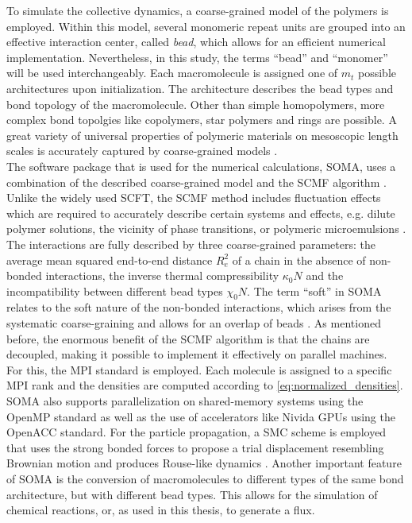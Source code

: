\documentclass[bachelor,       %
               twoside,        %
               BCOR10mm,       %
               ngerman, english %
               ]{GAUBM}
\begin{document}
To simulate the collective dynamics, a coarse-grained model of the polymers is employed. Within this model, several monomeric repeat units are grouped into an effective interaction center, called \textit{bead}, which allows for an efficient numerical implementation. Nevertheless, in this study, the terms \enquote{bead} and \enquote{monomer} will be used interchangeably. Each macromolecule is assigned one of $m_t$ possible architectures upon initialization. The architecture describes the bead types and bond topology of the macromolecule. Other than simple homopolymers, more complex bond topolgies like copolymers, star polymers and rings are possible. A great variety of universal properties of polymeric materials on mesoscopic length scales is accurately captured by coarse-grained models \cite{Baschnagel03}.\\
The software package that is used for the numerical calculations, \ac{SOMA}, uses a combination of the described coarse-grained model and the \ac{SCMF} algorithm \cite{Daoulas06}. Unlike the widely used \ac{SCFT}, the \ac{SCMF} method includes fluctuation effects which are required to accurately describe certain systems and effects, e.g. dilute polymer solutions, the vicinity of phase transitions, or polymeric microemulsions \cite{Bates97, Mueller02, Schmid03}. The interactions are fully described by three coarse-grained parameters: the average mean squared end-to-end distance $R_{e}^2$ of a chain in the absence of non-bonded interactions, the inverse thermal compressibility $\kappa_0 N$ and the incompatibility between different bead types $\chi_0 N$. The term \enquote{soft} in \ac{SOMA} relates to the soft nature of the non-bonded interactions, which arises from the systematic coarse-graining and allows for an overlap of beads \cite{Mueller11soft}. As mentioned before, the enormous benefit of the \ac{SCMF} algorithm is that the chains are decoupled, making it possible to implement it effectively on parallel machines. For this, the \ac{MPI} standard is employed. Each molecule is assigned to a specific \ac{MPI} rank and the densities are computed according to \eqref{eq:normalized_densities}. \ac{SOMA} also supports parallelization on shared-memory systems using the OpenMP standard as well as the use of accelerators like Nivida \acp{GPU} \cite{Schneider_soma} using the OpenACC standard. For the particle propagation, a \ac{SMC} scheme is employed that uses the strong bonded forces to propose a trial displacement resembling Brownian motion and produces Rouse-like dynamics \cite{Pangali78,Rossky78}. Another important feature of \ac{SOMA} is the conversion of macromolecules to different types of the same bond architecture, but with different bead types. This allows for the simulation of chemical reactions, or, as used in this thesis, to generate a flux. \\
\end{document}
